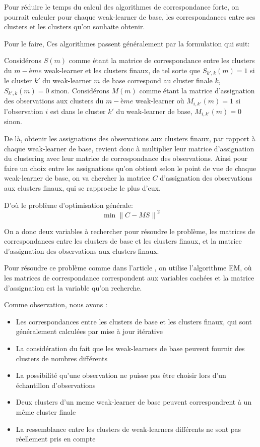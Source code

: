 \documentclass[12pt, french, latin.medieval, a4paper]{report}
\begin{document}
    Pour réduire le temps du calcul des algorithmes de correspondance forte, 
    on pourrait calculer pour chaque weak-learner de base, 
    les correspondances entre ses clusters et les clusters qu'on souhaite obtenir.

    Pour le faire, Ces algorithmes passent généralement par la formulation qui suit:
    
    Considérons $S(m)$ comme étant la matrice de correspondance entre les clusters du $m-ème$ weak-learner et les clusters finaux,
    de tel sorte que 
    $S_{k',k}(m) = 1$ si le cluster $k'$ du weak-learner $m$ de base correspond au cluster finale $k$, 
    $S_{k',k}(m) = 0$ sinon.
    Considérons $M(m)$ comme étant la matrice d'assignation des observations aux clusters du $m-ème$ weak-learner où 
    $M_{i,k'}(m) = 1$ si l'observation $i$ est dans le cluster $k'$ du weak-learner de base, 
    $M_{i,k'}(m) = 0$ sinon.

    De là, obtenir les assignations des observations aux clusters finaux, par rapport à chaque weak-learner de base, 
    revient donc à multiplier leur matrice d'assignation du clustering avec leur matrice de correspondance des observations.
    Ainsi pour faire un choix entre les assignations qu'on obtient selon le point de vue de chaque weak-learner de base, 
    on va chercher la matrice $C$ d'assignation des observations aux clusters finaux, qui se rapproche le plus d'eux.

    D'où le problème d'optimisation générale:
    \begin{equation}
        \min {\| C - MS \|}^2
    \end{equation}
    
    On a donc deux variables à rechercher pour résoudre le problème, 
    les matrices de correspondances entre les clusters de base et les clusters finaux,
    et la matrice d'assignation des observations aux clusters finaux.

    Pour résoudre ce problème comme dans l'article \cite{long2005combining}, on utilise l'algorithme EM, où les matrices de correspondance 
    correspondent aux variables cachées et la matrice d'assignation est la variable qu'on recherche.

    Comme observation, nous avons :
    \begin{itemize}
        \item Les correspondances entre les clusters de base et les clusters finaux, qui sont généralement calculées par mise à jour itérative
        \item La considération du fait que les weak-learners de base peuvent fournir des clusters de nombres différents
        \item La possibilité qu'une observation ne puisse pas être choisir lors d'un échantillon d'observations
        \item Deux clusters d'un meme weak-learner de base peuvent correspondrent à un même cluster finale
        \item La ressemblance entre les clusters de weak-learners différents ne sont pas réellement pris en compte
    \end{itemize}
\end{document}
